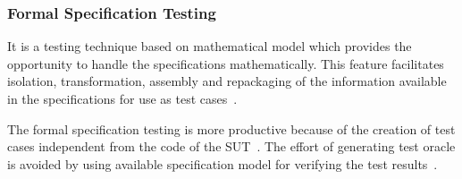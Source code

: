\subsubsection{Formal Specification Testing}
It is a testing technique based on mathematical model which provides the opportunity to handle the specifications mathematically. This feature facilitates isolation, transformation, assembly and repackaging of the information available in the specifications for use as test cases~\cite{donat1997automating}.

The formal specification testing is more productive because of the creation of test cases independent from the code of the SUT~\cite{gaudel2010software}. The effort of generating test oracle is avoided by using available specification model for verifying the test results~\cite{bertolino2007software}.
  







